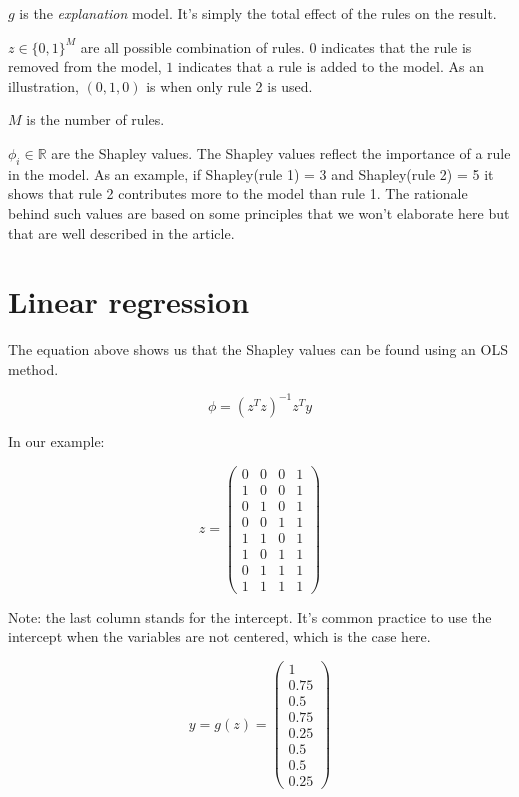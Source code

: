 $g$ is the \textit{explanation} model. It's simply the total effect of the rules on the result.

$z \in \{0,1\}^M$ are all possible combination of rules. $0$ indicates that the rule is removed from the model, $1$ indicates that a rule is added to the model. As an illustration, $(0,1,0)$ is when only rule 2 is used.

$M$ is the number of rules. 

$\phi_i \in \mathbb{R}$ are the Shapley values. The Shapley values reflect the importance of a rule in the model. As an example, if Shapley(rule 1) = 3 and Shapley(rule 2) = 5 it shows that rule 2 contributes more to the model than rule 1. The rationale behind such values are based on some principles that we won't elaborate here but that are well described in the article. \\

\section{Linear regression}

\label{sec:linear-regression}

The equation above shows us that the Shapley values can be found using an OLS method.

$$\phi = (z^Tz)^{-1}z^Ty$$

In our example:

$$z = \begin{pmatrix}
0 & 0 & 0 & 1\\
1 & 0 & 0 & 1\\
0 & 1 & 0 & 1\\
0 & 0 & 1 & 1\\
1 & 1 & 0 & 1\\
1 & 0 & 1 & 1\\
0 & 1 & 1 & 1\\
1 & 1 & 1 & 1
\end{pmatrix}$$

Note: the last column stands for the intercept. It's common practice to use the intercept when the variables are not centered, which is the case here.

$$y = g(z) = \begin{pmatrix}
1 \\
0.75 \\
0.5 \\
0.75 \\
0.25 \\
0.5 \\
0.5 \\
0.25
\end{pmatrix}$$

